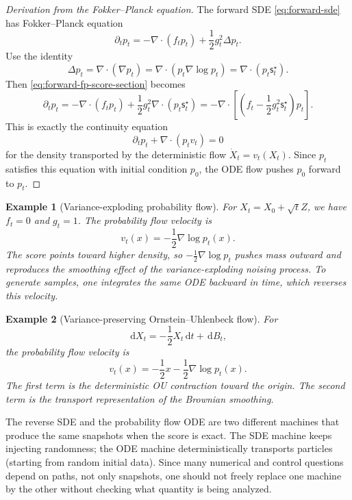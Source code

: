 \documentclass[10pt,a4paper]{amsart}
\numberwithin{equation}{section}
\newtheorem*{example}{Example}
\newcommand{\dd}{\,\mathrm{d}}
\newcommand{\sstar}{\mathsf{s}^{\star}}
\begin{document}
\begin{proof}[Derivation from the Fokker--Planck equation]
The forward SDE \eqref{eq:forward-sde} has Fokker--Planck equation
\begin{equation}\label{eq:forward-fp-score-section}
    \partial_t p_t
    =
    -\nabla\cdot(f_tp_t)
    +\frac12 g_t^2\Delta p_t.
\end{equation}
Use the identity
\[
    \Delta p_t
    =
    \nabla\cdot(\nabla p_t)
    =
    \nabla\cdot(p_t\nabla\log p_t)
    =
    \nabla\cdot(p_t\sstar_t).
\]
Then \eqref{eq:forward-fp-score-section} becomes
\[
    \partial_t p_t
    =
    -\nabla\cdot(f_tp_t)
    +\frac12 g_t^2\nabla\cdot(p_t\sstar_t)
    =
    -\nabla\cdot\left[
    \left(f_t-\frac12g_t^2\sstar_t\right)p_t
    \right].
\]
This is exactly the continuity equation
\begin{equation}\label{eq:continuity-pf}
    \partial_t p_t+\nabla\cdot(p_tv_t)=0
\end{equation}
for the density transported by the deterministic flow $\dot X_t=v_t(X_t)$.
Since $p_t$ satisfies this equation with initial condition $p_0$, the ODE flow
pushes $p_0$ forward to $p_t$.
\end{proof}




\begin{example}[Variance-exploding probability flow]
For $X_t=X_0+\sqrt t Z$, we have $f_t=0$ and $g_t=1$.  The probability flow
velocity is
\[
    v_t(x)=-\frac12\nabla\log p_t(x).
\]
The score points toward higher density, so $-\frac12\nabla\log p_t$ pushes mass
outward and reproduces the smoothing effect of the variance-exploding noising
process.  To generate samples, one integrates the same ODE backward in time,
which reverses this velocity.
\end{example}

\begin{example}[Variance-preserving Ornstein--Uhlenbeck flow]
For
\[
    \dd X_t=-\frac12X_t\dd t+\dd B_t,
\]
the probability flow velocity is
\[
    v_t(x)=-\frac12x-\frac12\nabla\log p_t(x).
\]
The first term is the deterministic OU contraction toward the origin.  The
second term is the transport representation of the Brownian smoothing.
\end{example}


The reverse SDE and
the probability flow ODE are two different machines that produce the same
snapshots when the score is exact.  The SDE machine keeps injecting randomness;
the ODE machine deterministically transports particles (starting from random initial data).  Since many numerical
and control questions depend on paths, not only snapshots, one should not
freely replace one machine by the other without checking what quantity is being
analyzed.
\end{document}
